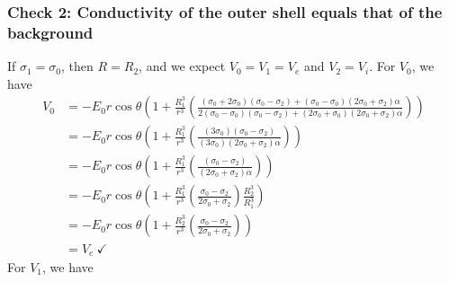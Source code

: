 \subsubsection{Check 2: Conductivity of the outer shell equals that of the background}
If $\sigma_1=\sigma_0$, then $R=R_2$, and we expect $V_0 = V_1= V_e$ and $V_2 = V_i$. For $V_0$, we have
\begin{displaymath}
    \begin{split}
    V_0
    &= -E_0 r \cos\theta
    \left(1+
    \frac{R_1^{3}}{r^3}
    \left(
    \frac{
    (\sigma_0 + 2\sigma_0)(\sigma_0 - \sigma_2) + (\sigma_0 - \sigma_0)(2\sigma_0 + \sigma_2)\alpha
    }
    {
    2 (\sigma_0-\sigma_0)(\sigma_0 - \sigma_2) + (2\sigma_0 + \sigma_0)(2\sigma_0 + \sigma_2)\alpha
    }
    \right)\right)
    \\
    &= -E_0 r \cos\theta
    \left(1+
    \frac{R_1^{3}}{r^3}
    \left(
    \frac{
    (3\sigma_0)(\sigma_0 - \sigma_2)
    }
    {
    (3\sigma_0)(2\sigma_0 + \sigma_2)\alpha
    }
    \right)\right)
    \\
    &= -E_0 r \cos\theta
    \left(1+
    \frac{R_1^{3}}{r^3}
    \left(
    \frac{
    (\sigma_0 - \sigma_2)
    }
    {
    (2\sigma_0 + \sigma_2)\alpha
    }
    \right)\right)
    \\
    &= -E_0 r \cos\theta
    \left(1+
    \frac{R_1^{3}}{r^3}
    \left(
    \frac{
    \sigma_0 - \sigma_2
    }
    {
    2\sigma_0 + \sigma_2
    }\right)
    \frac{R_2^3}{R_1^3}
    \right)
    \\
    &= -E_0 r \cos\theta
    \left(1+
    \frac{R_2^{3}}{r^3}
    \left(
    \frac{
    \sigma_0 - \sigma_2
    }
    {
    2\sigma_0 + \sigma_2
    }
    \right)\right)
    \\
    &= V_e ~\checkmark
    \end{split}
 \end{displaymath}
 For $V_1$, we have
